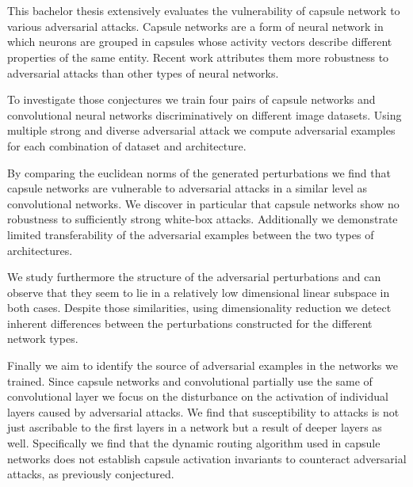 \section*{}

This bachelor thesis extensively evaluates the vulnerability of capsule network to various adversarial attacks.
Capsule networks are a form of neural network in which neurons are grouped in capsules whose activity vectors describe different properties of the same entity.
Recent work attributes them more robustness to adversarial attacks than other types of neural networks.

To investigate those conjectures we train four pairs of capsule networks and convolutional neural networks discriminatively on different image datasets.
Using multiple strong and diverse adversarial attack we compute adversarial examples for each combination of dataset and architecture.

By comparing the euclidean norms of the generated perturbations we find that capsule networks are vulnerable to adversarial attacks in a similar level as convolutional networks.
We discover in particular that capsule networks show no robustness to sufficiently strong white-box attacks.
Additionally we demonstrate limited transferability of the adversarial examples between the two types of architectures.

We study furthermore the structure of the adversarial perturbations and can observe that they seem to lie in a relatively low dimensional linear subspace in both cases.
Despite those similarities, using dimensionality reduction we detect inherent differences between the perturbations constructed for the different network types.

Finally we aim to identify the source of adversarial examples in the networks we trained.
Since capsule networks and convolutional partially use the same of convolutional layer we focus on the disturbance on the activation of individual layers caused by adversarial attacks.
We find that susceptibility to attacks is not just ascribable to the first layers in a network but a result of deeper layers as well.
Specifically we find that the dynamic routing algorithm used in capsule networks does not establish capsule activation invariants to counteract adversarial attacks, as previously conjectured.